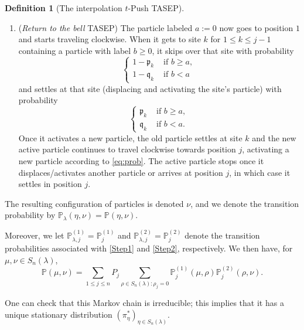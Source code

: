 \documentclass[12pt]{amsart}
\theoremstyle{definition}
\newtheorem{definition}[thm]{Definition}
\newcommand{\PP}{\mathbb P}
\newcommand{\PPone}[1]{\mathbb P^{(1)}_{#1}}
\newcommand{\PPtwo}[1]{\mathbb P^{(2)}_{#1}}
\newcommand{\mfp}{\mathfrak p}
\newcommand{\mfq}{\mathfrak q}
\begin{document}
\begin{definition}[The interpolation $t$-Push TASEP]
\begin{enumerate}[label=(Step \arabic*)]
  An equivalent way to describe the above process is that 
   each time the active particle passes a site with 
   a weaker particle, it continues to move with probability $t$, and settles at that site with probability $(1-t)$, displacing and activating the particle 
   that is located there.
   If it passes the $m$th such site, then it continues cyclically around the ring.  Note that an active particle will choose the $k$th available option with probability
   $$(1-t)(t^{k-1}+t^{k-1+m} + t^{k-1+2m}+ \dots) = 
   \frac{t^{k-1}}{1+t+\dots + t^{m-1}}.$$
   
   \item\label{Step2}(\emph{Return to the bell} TASEP)
   The particle labeled $a:=0$ 
   now goes to position $1$ and starts traveling clockwise.   When it gets to site $k$ for $1\leq k\leq j-1$ containing a particle with label $b \geq 0$, it 
   skips over that site with probability
   \begin{equation}\label{eq:probskip}
        \begin{cases}
       1-\mfp_k &\text{ if $b\geq a$},\\
       1-\mfq_k &\text{ if $b<a$}
   \end{cases}
   \end{equation}
   and 
   settles at that site (displacing and activating the site's particle) 
   with probability
    \begin{equation}\label{eq:prob}
        \begin{cases}
       \mfp_k &\text{ if $b\geq a$},\\
       \mfq_k &\text{ if $b<a$}.
   \end{cases}
   \end{equation}
Once it activates a new particle, the old particle settles at site $k$ and the new active particle continues to travel clockwise towards position $j$, activating a new particle according to \eqref{eq:prob}.   
   The active particle stops once it displaces/activates another particle or arrives at position $j$, in which case it settles in position $j$. 
\end{enumerate}
The resulting configuration of particles is denoted
$\nu$, and we denote the transition probability by $\PP_\lambda(\eta,\nu)=\PP(\eta,\nu)$.

Moreover, we let $\PPone{\lambda,j}=\PPone{j}$ and $\PPtwo{\lambda,j}=\PPtwo{j}$ denote the transition probabilities associated with \ref{Step1} and \ref{Step2}, respectively. We then have, for $\mu,\nu\in S_n(\lambda)$, 
$$\PP(\mu,\nu)=\sum_{1\leq j\leq n}P_j\sum_{\rho\in S_n(\lambda):\rho_j=0}\PPone{j}(\mu,\rho)\PPtwo{j}(\rho,\nu).$$
\end{definition}
One can check that this Markov chain is irreducible; this implies that it has a unique stationary distribution $(\pi^*_\eta)_{\eta\in S_n(\lambda)}$.
\end{document}
